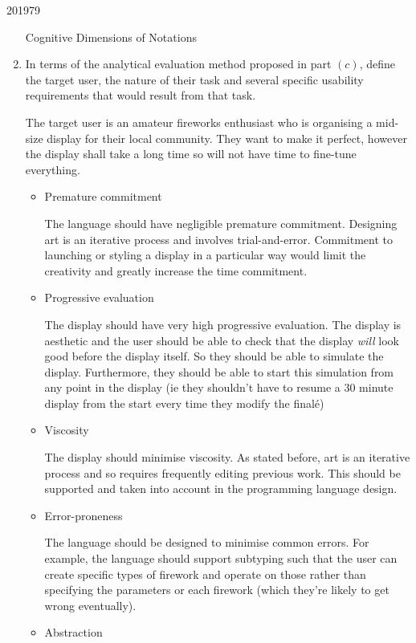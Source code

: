 \documentclass[10pt,\jkfside,a4paper]{article}
\begin{document}
\begin{examquestion}{2019}{7}{9}
\begin{enumerate}
Cognitive Dimensions of Notations

\item In terms of the analytical evaluation method proposed in part $(c)$,
define the target user, the nature of their task and several specific
usability requirements that would result from that task.

The target user is an amateur fireworks enthusiast who is organising a
mid-size display for their local community. They want to make it perfect,
however the display shall take a long time so will not have time to
fine-tune everything.

\begin{itemize}

\item Premature commitment

The language should have negligible premature commitment. Designing
art is an iterative process and involves trial-and-error. Commitment to
launching or styling a display in a particular way would limit the
creativity and greatly increase the time commitment.

\item Progressive evaluation

The display should have very high progressive evaluation. The
display is aesthetic and the user should be able to check that the display
\textit{will} look good before the display itself. So they should be able
to simulate the display. Furthermore, they should be able to start this
simulation from any point in the display (ie they shouldn't have to resume
a 30 minute display from the start every time they modify the final\'e)

\item Viscosity

The display should minimise viscosity. As stated before, art is an
iterative process and so requires frequently editing previous work. This
should be supported and taken into account in the programming language design.

\item Error-proneness

The language should be designed to minimise common errors. For example,
the language should support subtyping such that the user can create
specific types of firework and operate on those rather than specifying the
parameters or each firework (which they're likely to get wrong eventually).

\item Abstraction


\end{itemize}
\end{enumerate}
\end{examquestion}
\end{document}
